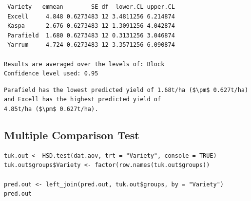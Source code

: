 \documentclass[a4paper, 10pt, fleqn, twosided]{memoir}
\begin{document}
\begin{tcolorbox}[title = Example 3 Predicted output]
\begin{verbatim}
 Variety   emmean        SE df  lower.CL upper.CL
 Excell     4.848 0.6273483 12 3.4811256 6.214874
 Kaspa      2.676 0.6273483 12 1.3091256 4.042874
 Parafield  1.680 0.6273483 12 0.3131256 3.046874
 Yarrum     4.724 0.6273483 12 3.3571256 6.090874

Results are averaged over the levels of: Block
Confidence level used: 0.95

\end{verbatim}
\end{tcolorbox}

\begin{tcolorbox}[title = Example 3 Prediction interpretation]
\begin{lstlisting}
Parafield has the lowest predicted yield of 1.68t/ha ($\pm$ 0.627t/ha)
and Excell has the highest predicted yield of
4.85t/ha ($\pm$ 0.627t/ha).
\end{lstlisting}
\end{tcolorbox}

\clearpage
\subsection{Multiple Comparison Test}

\begin{tcolorbox}[title = Example 3 Tukey's multiple comparison]
\begin{verbatim}
tuk.out <- HSD.test(dat.aov, trt = "Variety", console = TRUE)
tuk.out$groups$Variety <- factor(row.names(tuk.out$groups))

pred.out <- left_join(pred.out, tuk.out$groups, by = "Variety")
pred.out
\end{verbatim}
\end{tcolorbox}
\end{document}
